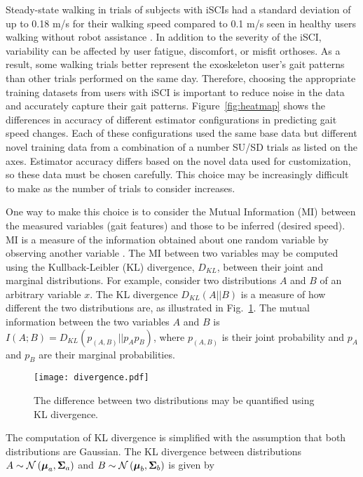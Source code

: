 Steady-state walking in trials of subjects with iSCIs had a standard deviation of up to 0.18 m/s for their walking speed compared to 0.1 m/s seen in healthy users walking without robot assistance \cite{socie2013gait}. In addition to the severity of the iSCI, variability can be affected by user fatigue, discomfort, or misfit orthoses. As a result, some walking trials better represent the exoskeleton user's gait patterns than other trials performed on the same day. Therefore, choosing the appropriate training datasets from users with iSCI is important to reduce noise in the data and accurately capture their gait patterns. Figure~\ref{fig:heatmap} shows the differences in accuracy of different estimator configurations in predicting gait speed changes. Each of these configurations used the same base data but different novel training data from a combination of a number SU/SD trials as listed on the axes. Estimator accuracy differs based on the novel data used for customization, so these data must be chosen carefully. This choice may be increasingly difficult to make as the number of trials to consider increases. 

One way to make this choice is to consider the Mutual Information (MI) between the measured variables (gait features) and those to be inferred (desired speed). MI is a measure of the information obtained about one random variable by observing another variable \cite{cover1999elements}. The MI between two variables may be computed using the Kullback-Leibler (KL) divergence, $ D_{KL} $, between their joint and marginal distributions. For example, consider two distributions $ A $ and $ B $ of an arbitrary variable $ x $. The KL divergence $ D_{KL}(A||B) $ is a measure of how different the two distributions are, as illustrated in Fig.~\ref{fig:divergence}. The mutual information between the two variables $ A $ and $ B $ is $ I(A;B) = D_{KL}(p_{(A,B)}||p_A p_B) $, where $ p_{(A,B)} $ is their joint probability and $ p_A $ and $ p_B $ are their marginal probabilities.
%
\begin{figure}
	\centering
	\texttt{[image: divergence.pdf]}
	\caption{The difference between two distributions may be quantified using KL divergence.}\label{fig:divergence}
\end{figure}

The computation of KL divergence is simplified with the assumption that both distributions are Gaussian. The KL divergence between distributions $ A \sim \mathcal{N}\left(\boldsymbol{\mu}_a, \boldsymbol{\Sigma}_a\right) $ and $ B \sim \mathcal{N}\left(\boldsymbol{\mu}_b, \boldsymbol{\Sigma}_b\right) $ is given by


